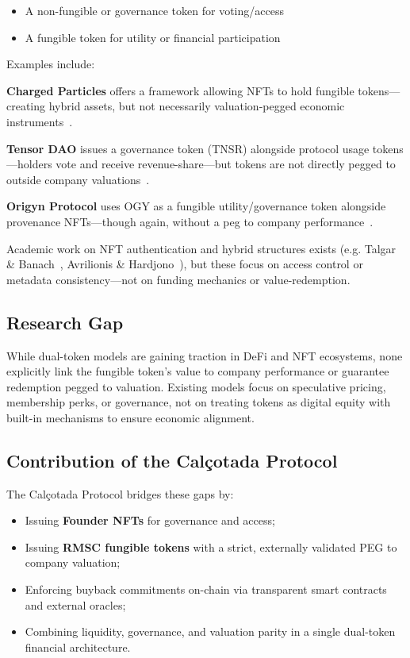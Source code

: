 \documentclass[conference]{IEEEtran}
\begin{document}
\begin{itemize}
    \item A non-fungible or governance token for voting/access
    \item A fungible token for utility or financial participation
\end{itemize}

Examples include:

\textbf{Charged Particles} offers a framework allowing NFTs to hold fungible tokens—creating hybrid assets, but not necessarily valuation‑pegged economic instruments~\cite{chargedparticles2022}.

\textbf{Tensor DAO} issues a governance token (TNSR) alongside protocol usage tokens—holders vote and receive revenue-share—but tokens are not directly pegged to outside company valuations~\cite{tensor2025}.

\textbf{Origyn Protocol} uses OGY as a fungible utility/governance token alongside provenance NFTs—though again, without a peg to company performance~\cite{origyn2022}.

Academic work on NFT authentication and hybrid structures exists (e.g. Talgar \& Banach~\cite{talgar2024dao}, Avrilionis \& Hardjono~\cite{avrilionis2022assetproxy}), but these focus on access control or metadata consistency—not on funding mechanics or value-redemption.

\subsection{Research Gap}

While dual-token models are gaining traction in DeFi and NFT ecosystems, none explicitly link the fungible token’s value to company performance or guarantee redemption pegged to valuation. Existing models focus on speculative pricing, membership perks, or governance, not on treating tokens as digital equity with built-in mechanisms to ensure economic alignment.

\subsection{Contribution of the Calçotada Protocol}

The Calçotada Protocol bridges these gaps by:

\begin{itemize}
    \item Issuing \textbf{Founder NFTs} for governance and access;
    \item Issuing \textbf{RMSC fungible tokens} with a strict, externally validated PEG to company valuation;
    \item Enforcing buyback commitments on-chain via transparent smart contracts and external oracles;
    \item Combining liquidity, governance, and valuation parity in a single dual-token financial architecture.
\end{itemize}
\end{document}
